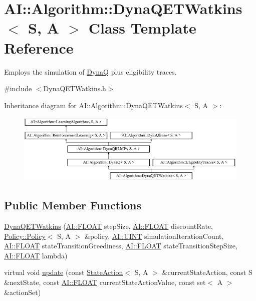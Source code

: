 \hypertarget{classAI_1_1Algorithm_1_1DynaQETWatkins}{\section{A\-I\-:\-:Algorithm\-:\-:Dyna\-Q\-E\-T\-Watkins$<$ S, A $>$ Class Template Reference}
\label{classAI_1_1Algorithm_1_1DynaQETWatkins}
}


Employs the simulation of \hyperlink{classAI_1_1Algorithm_1_1DynaQ}{Dyna\-Q} plus eligibility traces.  




{\ttfamily \#include $<$Dyna\-Q\-E\-T\-Watkins.\-h$>$}

Inheritance diagram for A\-I\-:\-:Algorithm\-:\-:Dyna\-Q\-E\-T\-Watkins$<$ S, A $>$\-:\begin{figure}[H]
\begin{center}
\leavevmode
\includegraphics[height=3.357314cm]{classAI_1_1Algorithm_1_1DynaQETWatkins}
\end{center}
\end{figure}
\subsection*{Public Member Functions}
\begin{DoxyCompactItemize}
\item 
\hyperlink{classAI_1_1Algorithm_1_1DynaQETWatkins_a0601ab5adb8ba7d0d94d93b6194528c9}{Dyna\-Q\-E\-T\-Watkins} (\hyperlink{namespaceAI_a41b74884a20833db653dded3918e05c3}{A\-I\-::\-F\-L\-O\-A\-T} step\-Size, \hyperlink{namespaceAI_a41b74884a20833db653dded3918e05c3}{A\-I\-::\-F\-L\-O\-A\-T} discount\-Rate, \hyperlink{classAI_1_1Algorithm_1_1Policy_1_1Policy}{Policy\-::\-Policy}$<$ S, A $>$ \&policy, \hyperlink{namespaceAI_ab6e14dc1e659854858a87e511f1439ec}{A\-I\-::\-U\-I\-N\-T} simulation\-Iteration\-Count, \hyperlink{namespaceAI_a41b74884a20833db653dded3918e05c3}{A\-I\-::\-F\-L\-O\-A\-T} state\-Transition\-Greediness, \hyperlink{namespaceAI_a41b74884a20833db653dded3918e05c3}{A\-I\-::\-F\-L\-O\-A\-T} state\-Transition\-Step\-Size, \hyperlink{namespaceAI_a41b74884a20833db653dded3918e05c3}{A\-I\-::\-F\-L\-O\-A\-T} lambda)
\item 
virtual void \hyperlink{classAI_1_1Algorithm_1_1DynaQETWatkins_aa4e40af0fd705cd5d1f7fd13834c57c6}{update} (const \hyperlink{classAI_1_1StateAction}{State\-Action}$<$ S, A $>$ \&current\-State\-Action, const S \&next\-State, const \hyperlink{namespaceAI_a41b74884a20833db653dded3918e05c3}{A\-I\-::\-F\-L\-O\-A\-T} current\-State\-Action\-Value, const set$<$ A $>$ \&action\-Set)
\end{DoxyCompactItemize}
